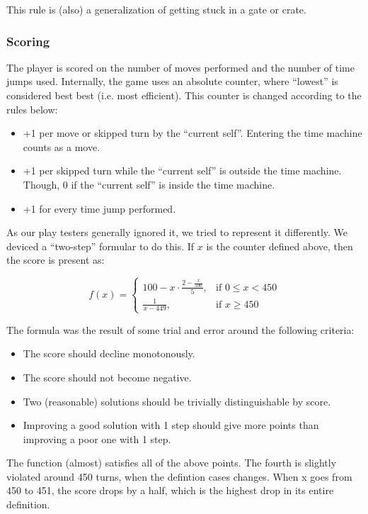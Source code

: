 This rule is (also) a generalization of getting stuck in a gate or
crate.

\subsubsection{Scoring}
The player is scored on the number of moves performed and the number
of time jumps used.  Internally, the game uses an absolute counter,
where ``lowest'' is considered best best (i.e. most efficient).
This counter is changed according to the rules below:

\begin{itemize}
\item +1 per move or skipped turn by the ``current self''.
  Entering the time machine counts as a move.
\item +1 per skipped turn while the ``current self'' is outside
  the time machine.  Though, 0 if the ``current self'' is inside the
  time machine.
\item +1 for every time jump performed.
\end{itemize}

As our play testers generally ignored it, we tried to represent it
differently.  We deviced a ``two-step'' formular to do this.  If $x$
is the counter defined above, then the score is present as:

\[
f(x) =
\begin{cases}
100 - x \cdot \frac{2 - \frac{x}{500}}{5}, & \mbox{if } 0 \leq x < 450\\
\frac{1}{x - 449}, & \mbox{if } x \geq 450
\end{cases}
\]

The formula was the result of some trial and error around the following
criteria:

\begin{itemize}
\item The score should decline monotonously.
\item The score should not become negative.
\item Two (reasonable) solutions should be trivially distinguishable by score.
\item Improving a good solution with 1 step should give more points
  than improving a poor one with 1 step.
\end{itemize}

The function (almost) satisfies all of the above points.  The fourth
is slightly violated around 450 turns, when the defintion cases
changes.  When x goes from 450 to 451, the score drops by a half,
which is the highest drop in its entire definition.


